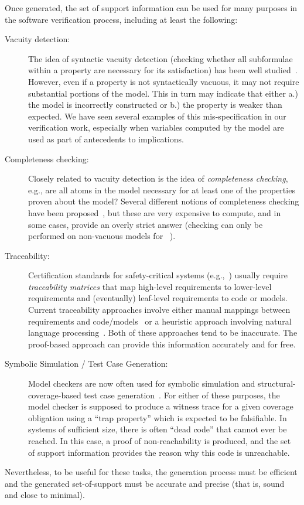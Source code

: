 Once generated, the set of support information can be used for many purposes in the software verification process, including at least the following:
\begin{description}
    \item[Vacuity detection:] The idea of syntactic vacuity detection (checking whether all subformulae within a property are necessary for its satisfaction) has been well studied~\cite{Kupferman}.   However, even if a property is not syntactically vacuous, it may not require substantial portions of the model.  This in turn may indicate that either a.) the model is incorrectly constructed or b.) the property is weaker than expected.  We have seen several examples of this mis-specification in our verification work, especially when variables computed by the model are used as part of antecedents to implications.
    \item[Completeness checking:] Closely related to vacuity detection is the idea of {\em completeness checking}, e.g., are all atoms in the model necessary for at least one of the properties proven about the model?  Several different notions of completeness checking have been proposed~\cite{Chockler, Kupferman}, but these are very expensive to compute, and in some cases, provide an overly strict answer (checking can only be performed on non-vacuous models for~\cite{Kupferman} ).
    \item[Traceability:] Certification standards for safety-critical systems (e.g.,~\cite{DO178B,MOD-0055}) usually require {\em traceability matrices} that map high-level requirements to lower-level requirements and (eventually) leaf-level requirements to code or models.  Current traceability approaches involve either manual mappings between requirements and code/models~\cite{Simulink} or a heuristic approach involving natural language processing~\cite{Huang}.  Both of these approaches tend to be inaccurate.  The proof-based approach can provide this information accurately and for free.
    \item[Symbolic Simulation / Test Case Generation:]  Model checkers are now often used for symbolic simulation and structural-coverage-based test case generation~\cite{Simulink Design Verifier, Our work}.  For either of these purposes, the model checker is supposed to produce a witness trace for a given coverage obligation using a ``trap property'' which is expected to be falsifiable.  In systems of sufficient size, there is often ``dead code'' that cannot ever be reached.  In this case, a proof of non-reachability is produced, and the set of support information provides the reason why this code is unreachable.
\end{description}
\noindent Nevertheless, to be useful for these tasks, the generation
process must be efficient and the generated set-of-support must be
accurate and precise (that is, sound and close to minimal).  


